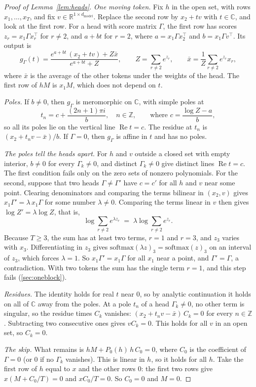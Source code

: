 \documentclass[10pt]{article}
\theoremstyle{definition}
\theoremstyle{remark}
\newcommand{\R}{\mathbb{R}}
\newcommand{\dm}{d_{\mathrm{model}}}
\begin{document}
\begin{proof}[Proof of Lemma~\ref{lem:heads}]
\emph{One moving token.} Fix $h$ in the open set, with rows $x_1, \dots, x_T$, and fix $v \in \R^{1\times\dm}$. Replace the second row by $x_2 + tv$ with $t \in \mathbb{C}$, and look at the first row. For a head with score matrix $\Gamma$, the first row has scores $z_r = x_1\Gamma x_r^\top$ for $r \neq 2$, and $a + bt$ for $r = 2$, where $a = x_1\Gamma x_2^\top$ and $b = x_1\Gamma v^\top$. Its output is
\[
g_\Gamma(t) = \frac{e^{a+bt}\,(x_2 + tv) + Z\bar x}{e^{a+bt} + Z}, \qquad Z = \sum_{r\neq 2} e^{z_r}, \qquad \bar x = \frac1Z\sum_{r\neq 2} e^{z_r}x_r,
\]
where $\bar x$ is the average of the other tokens under the weights of the head. The first row of $hM$ is $x_1M$, which does not depend on $t$.

\emph{Poles.} If $b \neq 0$, then $g_\Gamma$ is meromorphic on $\mathbb{C}$, with simple poles at
\[
t_n = c + \frac{(2n+1)\pi i}{b}, \quad n \in \mathbb{Z}, \qquad\text{where } c = \frac{\log Z - a}{b},
\]
so all its poles lie on the vertical line $\operatorname{Re} t = c$. The residue at $t_n$ is $(x_2 + t_nv - \bar x)/b$. If $\Gamma = 0$, then $g_\Gamma$ is affine in $t$ and has no poles.

\emph{The poles tell the heads apart.} For $h$ and $v$ outside a closed set with empty interior, $b \neq 0$ for every $\Gamma_k \neq 0$, and distinct $\Gamma_k \neq 0$ give distinct lines $\operatorname{Re} t = c$. The first condition fails only on the zero sets of nonzero polynomials. For the second, suppose that two heads $\Gamma \neq \Gamma'$ have $c = c'$ for all $h$ and $v$ near some point. Clearing denominators and comparing the terms bilinear in $(x_2, v)$ gives $x_1\Gamma' = \lambda\, x_1\Gamma$ for some number $\lambda \neq 0$. Comparing the terms linear in $v$ then gives $\log Z' = \lambda \log Z$, that is,
\[
\log \sum_{r\neq 2} e^{\lambda z_r} \;=\; \lambda \log \sum_{r\neq 2} e^{z_r}.
\]
Because $T \ge 3$, the sum has at least two terms, $r = 1$ and $r = 3$, and $z_3$ varies with $x_3$. Differentiating in $z_3$ gives $\mathrm{softmax}(\lambda z)_3 = \mathrm{softmax}(z)_3$ on an interval of $z_3$, which forces $\lambda = 1$. So $x_1\Gamma' = x_1\Gamma$ for all $x_1$ near a point, and $\Gamma' = \Gamma$, a contradiction. With two tokens the sum has the single term $r = 1$, and this step fails (\cref{sec:oneblock}).

\emph{Residues.} The identity holds for real $t$ near $0$, so by analytic continuation it holds on all of $\mathbb{C}$ away from the poles. At a pole $t_n$ of a head $\Gamma_k \neq 0$, no other term is singular, so the residue times $C_k$ vanishes: $(x_2 + t_nv - \bar x)\, C_k = 0$ for every $n \in \mathbb{Z}$. Subtracting two consecutive ones gives $vC_k = 0$. This holds for all $v$ in an open set, so $C_k = 0$.

\emph{The skip.} What remains is $hM + P_0(h)\,h\,C_0 = 0$, where $C_0$ is the coefficient of $\Gamma = 0$ (or $0$ if no $\Gamma_k$ vanishes). This is linear in $h$, so it holds for all $h$. Take the first row of $h$ equal to $x$ and the other rows $0$: the first two rows give $x(M + C_0/T) = 0$ and $xC_0/T = 0$. So $C_0 = 0$ and $M = 0$.
\end{proof}
\end{document}
